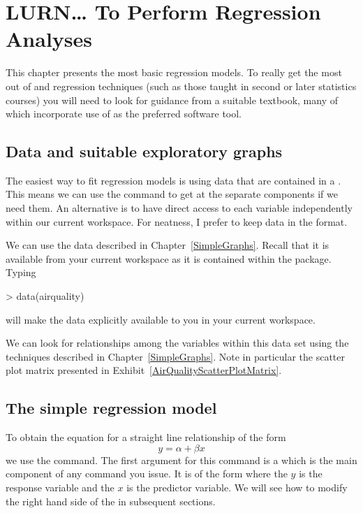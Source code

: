 \chapter{LURN\ldots{} To Perform Regression Analyses} 
\label{Regression} 
 
 

 
This chapter presents the most basic regression models. To really get the most out of \R{} and regression techniques (such as those taught in second or later statistics courses) you will need to look for guidance from a suitable textbook, many of which incorporate use of \R{} as the preferred software tool. 
 
\section{Data and suitable exploratory graphs} 
 
The easiest way to fit regression models is using data that are contained in a . This means we can use the  command to get at the separate components if we need them. An alternative is to have direct access to each variable independently within our current workspace. For neatness, I prefer to keep data in the  format. 
 
We can use the  data described in Chapter~\ref{SimpleGraphs}. Recall that it is available from your current workspace as it is contained within the  package. Typing 
\begin{Schunk}
\begin{Sinput}
> data(airquality) 
\end{Sinput}
\end{Schunk}
will make the data explicitly available to you in your current \R{} workspace. 
 
We can look for relationships among the variables within this data set using the techniques described in Chapter~\ref{SimpleGraphs}. Note in particular the scatter plot matrix presented in Exhibit~\ref{AirQualityScatterPlotMatrix}. 
 
 
 
\section{The simple regression model} 
 
To obtain the equation for a straight line relationship of the form \begin{equation} 
y=\alpha+\beta{}x 
\end{equation} we use the  command. The first argument for this command is a  which is the main component of any  command you issue. It is of the form  where the $y$ is the response variable and the $x$ is the predictor variable. We will see how to modify the right hand side of the  in subsequent sections.  
 
